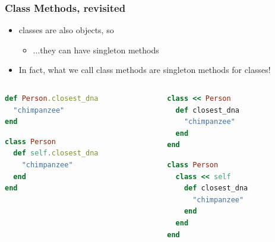 \begin{frame}[fragile]\frametitle{Class Methods, revisited}

\begin{itemize}
\item classes are also objects, so
\begin{itemize}
\item ...they can have singleton methods 
\end{itemize}   \pause
\item In fact, what we call class methods are singleton methods for classes!
\end{itemize}

\pause

\begin{columns}[c] 

\begin{column}{5.5cm}

\begin{lstlisting}[language=ruby, escapechar={^}]
def Person.closest_dna
  "chimpanzee"
end
\end{lstlisting}
\pause
\begin{lstlisting}[language=ruby, escapechar={^}]
class Person
  def self.closest_dna
    "chimpanzee"
  end
end
\end{lstlisting}


\end{column}

\pause

\begin{column}{5.5cm}

\begin{lstlisting}[language=ruby, escapechar={^}]
class << Person
  def closest_dna
    "chimpanzee"
  end
end
\end{lstlisting}
\pause
\begin{lstlisting}[language=ruby, escapechar={^}]
class Person
  class << self
    def closest_dna
      "chimpanzee"
    end
  end
end
\end{lstlisting}

\end{column}

\end{columns}

\end{frame}




